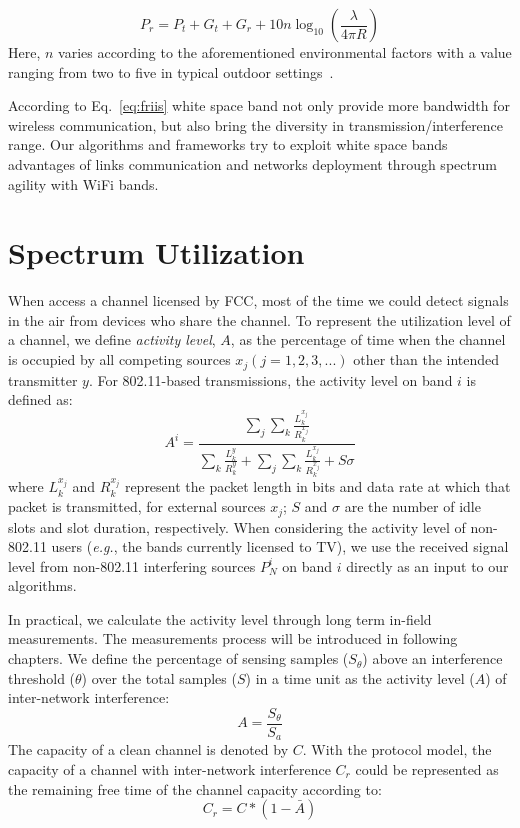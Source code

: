 \begin{equation}
\label{eq:friis}
P_r=P_t+G_t+G_r+10n \log_{10}\left( \frac{\lambda}{4\pi R}\right)
\end{equation}
Here, $n$ varies according to the aforementioned environmental factors with a value 
ranging from two to five in typical outdoor settings~\cite{rappaport}.

According to Eq.~\ref{eq:friis} white space band not only provide more bandwidth for 
wireless communication, but also bring the diversity in transmission/interference range. 
Our algorithms and frameworks try to exploit white space bands advantages of links 
communication and networks deployment through spectrum agility with WiFi bands.


\section{Spectrum Utilization}

When access a channel licensed by FCC, most of the time we could detect signals in the 
air from devices who share the channel. To represent the utilization level of a channel, 
we define \emph{activity level}, $A$, as the percentage of time when the channel is 
occupied by all competing sources $x_j (j = 1, 2, 3, ...)$ other than the intended 
transmitter $y$. For 802.11-based transmissions, the activity level on band $i$ is 
defined as:
\begin{equation}
\label{eqn:80211activity}
A^i = \frac{\sum_j{\sum_k{\frac{L_k^{x_j}}{R_k^{x_j}}}}}{\sum_k{\frac{L_k^y}{R_k^y}}+\sum_j{\sum_k{\frac{L_k^{x_j}}{R_k^{x_j}}}}+S\sigma}
\end{equation}
where $L_k^{x_j}$ and $R_k^{x_j}$ represent the packet length in bits and data
rate at which that packet is transmitted, for external sources $x_j$;
$S$ and $\sigma$ are the number of idle slots and slot duration, respectively. 
When considering the activity level of non-802.11 users 
({\it e.g.}, the bands currently licensed to TV),
we use the received signal level from non-802.11 interfering sources $P_N^i$ 
on band $i$ directly as an input to our algorithms. 


In practical, we calculate the activity level through long term in-field measurements.
The measurements process will be introduced in following chapters. We define the percentage 
of sensing samples ($S_\theta$) above an interference threshold ($\theta$) over the total 
samples ($S$) in a time unit as the activity level ($A$) of inter-network interference:
\begin{equation}
\label{eq:actdef}
A=\frac{S_\theta}{S_a}
\end{equation}
The capacity of a clean channel is denoted by $C$. With the protocol model, the capacity 
of a channel with inter-network interference $C_r$ could be represented as the remaining 
free time of the channel capacity according to: 
\begin{equation}
\label{eq:intercap}
C_r=C*(1-\bar{A})
\end{equation}


